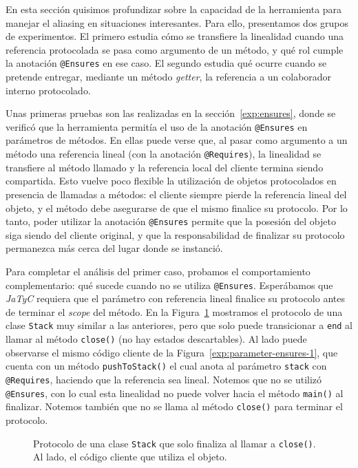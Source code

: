 En esta sección quisimos profundizar sobre la capacidad de la herramienta para manejar el aliasing en situaciones interesantes. Para ello, presentamos dos grupos de experimentos. El primero estudia cómo se transfiere la linealidad cuando una referencia protocolada se pasa como argumento de un método, y qué rol cumple la anotación \texttt{@Ensures} en ese caso. El segundo estudia qué ocurre cuando se pretende entregar, mediante un método \textit{getter}, la referencia a un colaborador interno protocolado.

Unas primeras pruebas son las realizadas en la sección~\ref{exp:ensures}, donde se verificó que la herramienta permitía el uso de la anotación \texttt{@Ensures} en parámetros de métodos. En ellas puede verse que, al pasar como argumento a un método una referencia lineal (con la anotación \texttt{@Requires}), la linealidad se transfiere al método llamado y la referencia local del cliente termina siendo compartida. Esto vuelve poco flexible la utilización de objetos protocolados en presencia de llamadas a métodos: el cliente siempre pierde la referencia lineal del objeto, y el método debe asegurarse de que el mismo finalice su protocolo. Por lo tanto, poder utilizar la anotación \texttt{@Ensures} permite que la posesión del objeto siga siendo del cliente original, y que la responsabilidad de finalizar su protocolo permanezca más cerca del lugar donde se instanció.

Para completar el análisis del primer caso, probamos el comportamiento complementario: qué sucede cuando no se utiliza \texttt{@Ensures}. Esperábamos que \textit{JaTyC} requiera que el parámetro con referencia lineal finalice su protocolo antes de terminar el \textit{scope} del método. En la Figura~\ref{exp:parameter-ensures-3} mostramos el protocolo de una clase \texttt{Stack} muy similar a las anteriores, pero que solo puede transicionar a \texttt{end} al llamar al método \texttt{close()} (no hay estados descartables). Al lado puede observarse el mismo código cliente de la Figura~\ref{exp:parameter-ensures-1}, que cuenta con un método \texttt{pushToStack()} el cual anota al parámetro \texttt{stack} con \texttt{@Requires}, haciendo que la referencia sea lineal. Notemos que no se utilizó \texttt{@Ensures}, con lo cual esta linealidad no puede volver hacia el método \texttt{main()} al finalizar. Notemos también que no se llama al método \texttt{close()} para terminar el protocolo.

\begin{figure}[htbp]
\centering
\begin{minipage}[t]{0.48\textwidth}
    
\end{minipage}
\hfill
\begin{minipage}[t]{0.48\textwidth}
    
\end{minipage}
\caption{Protocolo de una clase \texttt{Stack} que solo finaliza al llamar a \texttt{close()}. Al lado, el código cliente que utiliza el objeto.}
\label{exp:parameter-ensures-3}
\end{figure}

